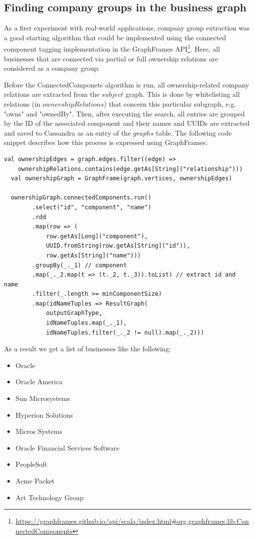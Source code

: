 \documentclass[
        a4paper,     %
        titlepage,   %
        oneside,     %
        parskip      %
]{scrartcl}          %
\begin{document}
  \subsection{Finding company groups in the business graph}
  \label{sec:company_groups}
  As a first experiment with real-world applications, company group extraction
  was a good starting algorithm that could be implemented using the connected component
  tagging implementation in the GraphFrames
  API\footnote{\url{https://graphframes.github.io/api/scala/index.html\#org.graphframes.lib.ConnectedComponents}}.
  Here, all businesses that are connected via partial or full ownership
  relations are considered as a company group.

  Before the ConnectedComponets algorithm is run, all ownership-related company
  relations are extracted from the $subject$ graph. This is done by whitelisting
  all relations (in $ownershipRelations$) that concern this particular subgraph,
  e.g. "owns" and "ownedBy".
  Then, after executing the search, all entries are grouped by the ID of the
  associated component and their names and UUIDs are extracted and saved to Cassandra
  as an entry of the $graphs$ table. The following code snippet describes how
  this process is expressed using GraphFrames:

  \begin{lstlisting}[style=scalaStyle,caption=Company Group Extraction]
  val ownershipEdges = graph.edges.filter((edge) =>
    ownershipRelations.contains(edge.getAs[String]("relationship")))
  val ownershipGraph = GraphFrame(graph.vertices, ownershipEdges)

  ownershipGraph.connectedComponents.run()
		.select("id", "component", "name")
		.rdd
		.map(row => (
			row.getAs[Long]("component"),
			UUID.fromString(row.getAs[String]("id")),
			row.getAs[String]("name")))
		.groupBy(_._1) // component
		.map(_._2.map(t => (t._2, t._3)).toList) // extract id and name
		.filter(_.length >= minComponentSize)
		.map(idNameTuples => ResultGraph(
			outputGraphType,
			idNameTuples.map(_._1),
			idNameTuples.filter(_._2 != null).map(_._2)))
  \end{lstlisting}

  As a result we get a list of businesses like the following:
  \begin{itemize}[noitemsep]
  \item Oracle
  \item Oracle America
  \item Sun Microsystems
  \item Hyperion Solutions
  \item Micros Systems
  \item Oracle Financial Services Software
  \item PeopleSoft
  \item Acme Packet
  \item Art Technology Group
  \end{itemize}
\end{document}
